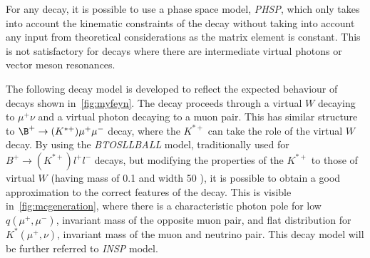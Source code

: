 For any decay, it is possible to use a phase space model, \textit{PHSP}, which only takes into account the kinematic constraints of the decay without taking into account any input from theoretical considerations as the matrix element is constant. This is not satisfactory for decays where there are intermediate virtual photons or vector meson resonances.

The following decay model is developed to reflect the expected behaviour of decays shown in~\autoref{fig:myfeyn}. The decay proceeds through a virtual $W$ decaying to $\mu^{+} \nu$ and a virtual photon decaying to a muon pair. This has similar structure to \DIFaddbegin {}\DIFaddend $\B^{+} \rightarrow (K^{*+}) \mu^{+} \mu^{-}$ decay, where the $K^{*+}$ can take the role of the virtual $W$ decay. By using the \textit{BTOSLLBALL} model\cite{Ali:1999mm}, traditionally used for $B^{+} \rightarrow (K^{*+}) l^{+} l^{-}$ decays, but modifying the properties of the $K^{*+}$ to those of \DIFaddbegin {}\DIFaddend virtual $W$ (having mass of 0.1 \gevcc and width 50 \gev), it is possible to obtain a good approximation to the correct features of the decay. This is visible in~\autoref{fig:mcgeneration}, where there is a characteristic photon pole for low $q(\mu^{+},\mu^{-})$, \DIFaddbegin {}\DIFaddend invariant mass of the opposite muon pair, and flat distribution for $K^{*}(\mu^{+}, \nu) $, \DIFaddbegin {}\DIFaddend invariant mass of the muon and neutrino pair. This decay model will be further referred to \DIFdelbegin {}\DIFdelend \DIFaddbegin {}\DIFaddend \textit{INSP} model. 




